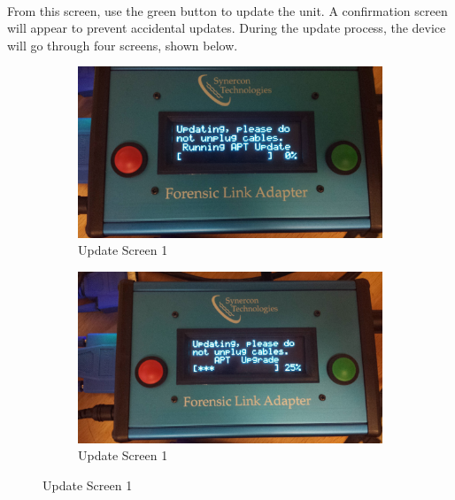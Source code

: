 \documentclass[11pt]{article}
\begin{document}
\\[\baselineskip]
From this screen, use the green button to update the unit. A confirmation screen will appear to prevent accidental updates.\newline
During the update process, the device will go through four screens, shown below.

\begin{figure}[tbph]
        \centering
        \begin{subfigure}[b]{0.475\textwidth}
            \centering
            \includegraphics[width=\textwidth]{./fla_screens/update_apt}
            \caption[Network2]%
            {{\small Update Screen 1}}    
            \label{fig:fla_update_1}
        \end{subfigure}
        \hfill
        \begin{subfigure}[b]{0.475\textwidth}  
            \centering 
            \includegraphics[width=\textwidth]{./fla_screens/update_apt_upgrade}
            \caption[]%
            {{\small Update Screen 1}}    
            \label{fig:fla_update_2}
        \end{subfigure}

\end{figure}
\end{document}
